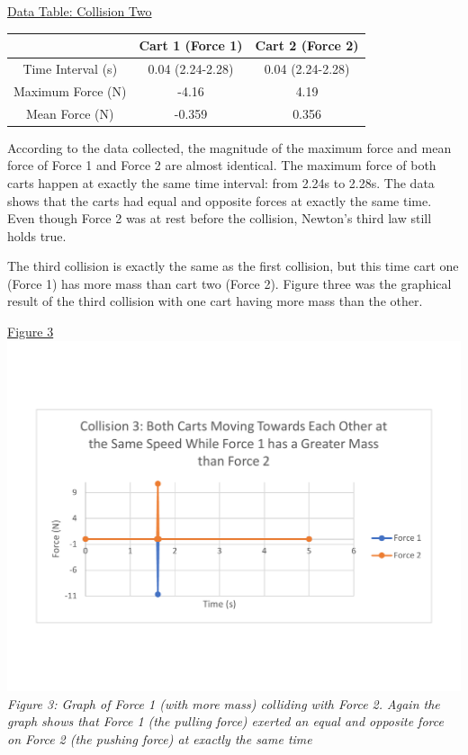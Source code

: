 \documentclass[aps,letterpaper,11pt]{revtex4}
\begin{document}
\newpage

\begin{center}
\underline{Data Table: Collision Two}\\
\begin{tabular}{|c|c|c|}
\hline
 & Cart 1 (Force 1) & Cart 2 (Force 2)\\
 \hline
 Time Interval (s) & 0.04 (2.24-2.28) & 0.04 (2.24-2.28)\\
 \hline
 Maximum Force (N) & -4.16 & 4.19\\
 \hline
 Mean Force (N) & -0.359 & 0.356\\
 \hline
\end{tabular}
\end{center}

According to the data collected, the magnitude of the maximum force and mean force of Force 1 and Force 2 are almost identical. The maximum force of both carts happen at exactly the same time interval: from 2.24s to 2.28s. The data shows that the carts had equal and opposite forces at exactly the same time. Even though Force 2 was at rest before the collision, Newton's third law still holds true. 

The third collision is exactly the same as the first collision, but this time cart one (Force 1) has more mass than cart two (Force 2). Figure three was the graphical result of the third collision with one cart having more mass than the other.

\begin{center}
\underline{Figure 3}\\
\vspace{-10mm}
\includegraphics[width=6in]{Collision3Graph.pdf}\\
\textit{Figure 3: Graph of Force 1 (with more mass) colliding with Force 2. Again the graph shows that Force 1 (the pulling force) exerted an equal and opposite force on Force 2 (the pushing force) at exactly the same time}
\end{center}
\end{document}
